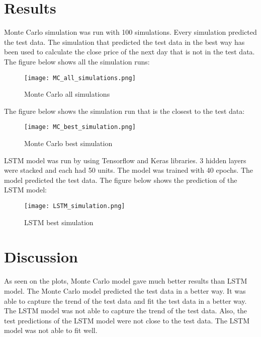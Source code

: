 \documentclass[12pt, a4paper]{article}
\begin{document}
\section{Results}
Monte Carlo simulation was run with 100 simulations.  Every simulation predicted the test data.  The simulation that predicted the test data in the best way has been used to calculate the close price of the next day that is not in the test data.\\

The figure below shows all the simulation runs:\\

\begin{figure}[h]
\texttt{[image: MC\_all\_simulations.png]}
\caption{Monte Carlo all simulations}
\label{fig:mc_all_runs}
\end{figure}

The figure below shows the simulation run that is the closest to the test data:\\

\begin{figure}[h]
\texttt{[image: MC\_best\_simulation.png]}
\caption{Monte Carlo best simulation}
\label{fig:mc_best_run}
\end{figure}

LSTM model was run by using Tensorflow and Keras libraries.  3 hidden layers were stacked and each had 50 units.  The model was trained with 40 epochs.  The model predicted the test data.  The figure below shows the prediction of the LSTM model:\\

\begin{figure}[h]
\texttt{[image: LSTM\_simulation.png]}
\caption{LSTM best simulation}
\label{fig:lstm_best_run}
\end{figure}

\section{Discussion}
As seen on the plots, Monte Carlo model gave much better results than LSTM model.  The Monte Carlo model predicted the test data in a better way.  It was able to capture the trend of the test data and fit the test data in a better way.  The LSTM model was not able to capture the trend of the test data.  Also, the test predictions of the LSTM model were not close to the test data.  The LSTM model was not able to fit well.\\
\end{document}
